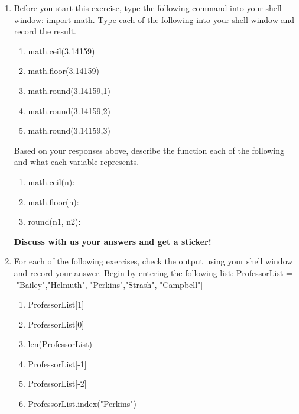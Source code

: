 \documentclass[11pt, letterpaper, onecolumn, oneside, final]{article}
\begin{document}
\begin{enumerate}
\item Before you start this exercise, type the following command into your shell window: {\consolas import math}. Type each of the following into your shell window and record the result. 
\begin{enumerate}
    \item {\consolas math.ceil(3.14159)}
    \item {\consolas math.floor(3.14159)}
    \item {\consolas math.round(3.14159,1)}
    \item {\consolas math.round(3.14159,2)}
    \item {\consolas math.round(3.14159,3)}
\end{enumerate}
Based on your responses above, describe the function each of the following and what each variable represents.
\begin{enumerate}
    \item {\consolas math.ceil(n)}:\\
    \item {\consolas math.floor(n)}:\\
    \item {\consolas round(n1, n2)}:\\
\end{enumerate}
\textbf{Discuss with us your answers and get a sticker!}

\item
For each of the following exercises, check the output using your shell window and record your answer. Begin by entering the following list:  {\consolas ProfessorList = ["Bailey","Helmuth", "Perkins","Strash", "Campbell"]}
\begin{enumerate}
    \item {\consolas ProfessorList[1]}\\
    \item {\consolas ProfessorList[0]}\\
    \item {\consolas len(ProfessorList)}\\
    \item {\consolas ProfessorList[-1]}\\
    \item {\consolas ProfessorList[-2]}\\
    \item {\consolas ProfessorList.index("Perkins")}\\
    
\end{enumerate}


\end{enumerate}
\end{document}
